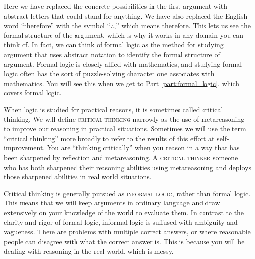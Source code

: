 Here we have replaced the concrete possibilities in the first argument with abstract letters that could stand for anything. We have also replaced the English word ``therefore'' with the symbol ``$\therefore$,'' which means therefore. This lets us see the formal structure of the argument, which is why it works in any domain you can think of. In fact, we can think of formal logic as the method for studying argument that uses abstract notation to identify the formal structure of argument.  Formal logic is closely allied with mathematics, and studying formal logic often has the sort of puzzle-solving character one associates with mathematics. You will see this when we get to Part \ref{part:formal_logic}, which covers formal logic.

When logic is studied for practical reasons, it is sometimes called critical thinking. We will define \textsc{\gls{critical thinking}}\label{def:critical_thinking} narrowly as the use of metareasoning to improve our reasoning in practical situations. Sometimes we will use the term ``critical thinking'' more broadly to refer to the results of this effort at self-improvement.  You are ``thinking critically'' when you reason in a way that has been sharpened by reflection and metareasoning. A \textsc{\gls{critical thinker}}\label{def:critical_thinker} someone who has both sharpened their reasoning abilities using metareasoning and deploys those sharpened abilities in real world situations.

Critical thinking is generally pursued as \textsc{\gls{informal logic}}, rather than formal logic. This means that we will keep arguments in ordinary language and draw extensively on your knowledge of the world to evaluate them. In contrast to the clarity and rigor of formal logic, informal logic is suffused with ambiguity and vagueness. There are problems with multiple correct answers, or where reasonable people can disagree with what the correct answer is. This is because you will be dealing with reasoning in the real world, which is messy.

